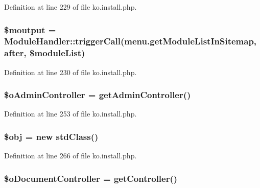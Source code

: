 Definition at line 229 of file ko.\+install.\+php.

\hypertarget{ko_8install_8php_a2598d068355cca17645bc6bd70cc3a8c}{}
\subsubsection[{\$moutput}]{\setlength{\rightskip}{0pt plus 5cm}\$moutput = {\bf Module\+Handler\+::trigger\+Call}(\textquotesingle{}menu.\+get\+Module\+List\+In\+Sitemap\textquotesingle{}, \textquotesingle{}after\textquotesingle{}, \$module\+List)}\label{ko_8install_8php_a2598d068355cca17645bc6bd70cc3a8c}


Definition at line 230 of file ko.\+install.\+php.

\hypertarget{ko_8install_8php_a52d90466dc7adee7d324b3ef032b8167}{}
\subsubsection[{\$o\+Admin\+Controller}]{\setlength{\rightskip}{0pt plus 5cm}\$o\+Admin\+Controller = {\bf get\+Admin\+Controller}(\textquotesingle{})}\label{ko_8install_8php_a52d90466dc7adee7d324b3ef032b8167}


Definition at line 253 of file ko.\+install.\+php.

\hypertarget{ko_8install_8php_a9008ed94ba185855b1723e367744b87e}{}
\subsubsection[{\$obj}]{\setlength{\rightskip}{0pt plus 5cm}\$obj = new std\+Class()}\label{ko_8install_8php_a9008ed94ba185855b1723e367744b87e}


Definition at line 266 of file ko.\+install.\+php.

\hypertarget{ko_8install_8php_aac43fce682d4b7a05df6d3e44c2c54e6}{}
\subsubsection[{\$o\+Document\+Controller}]{\setlength{\rightskip}{0pt plus 5cm}\$o\+Document\+Controller = {\bf get\+Controller}(\textquotesingle{})}\label{ko_8install_8php_aac43fce682d4b7a05df6d3e44c2c54e6}


